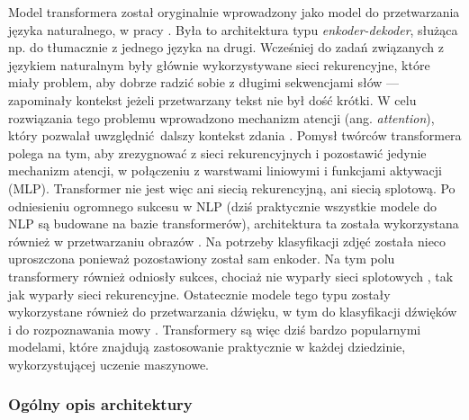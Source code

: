 Model transformera został oryginalnie wprowadzony jako model do przetwarzania języka naturalnego, w
pracy \cite{vaswani_attention_2017}. Była to architektura typu \emph{enkoder-dekoder}, służąca np.
do tłumacznie z jednego języka na drugi. Wcześniej do zadań związanych z językiem naturalnym były
głównie wykorzystywane sieci rekurencyjne, które miały problem, aby dobrze radzić sobie z długimi
sekwencjami słów --- zapominały kontekst jeżeli przetwarzany tekst nie był dość krótki. W celu
rozwiązania tego problemu wprowadzono mechanizm atencji (ang. \emph{attention}), który pozwalał
uwzględnić dalszy kontekst zdania \cite{bahdanau_neural_2016}. Pomysł twórców transformera polega na
tym, aby zrezygnować z sieci rekurencyjnych i pozostawić jedynie mechanizm atencji, w połączeniu z
warstwami liniowymi i funkcjami aktywacji (MLP). Transformer nie jest więc ani siecią rekurencyjną,
ani siecią splotową. Po odniesieniu ogromnego sukcesu w NLP (dziś praktycznie wszystkie modele do
NLP są budowane na bazie transformerów), architektura ta została wykorzystana również w
przetwarzaniu obrazów \cite{dosovitskiy_image_2021}. Na potrzeby klasyfikacji zdjęć została nieco
uproszczona ponieważ pozostawiony został sam enkoder. Na tym polu transformery również odniosły
sukces, chociaż nie wyparły sieci splotowych \cite{liu_convnet_2022}, tak jak wyparły sieci
rekurencyjne. Ostatecznie modele tego typu zostały wykorzystane również do przetwarzania dźwięku, w
tym do klasyfikacji dźwięków \cite{gong_ast_2021} i do rozpoznawania mowy
\cite{kim_squeezeformer_2022}. Transformery są więc dziś bardzo popularnymi modelami, które znajdują
zastosowanie praktycznie w każdej dziedzinie, wykorzystującej uczenie maszynowe.

\subsubsection{Ogólny opis architektury}

